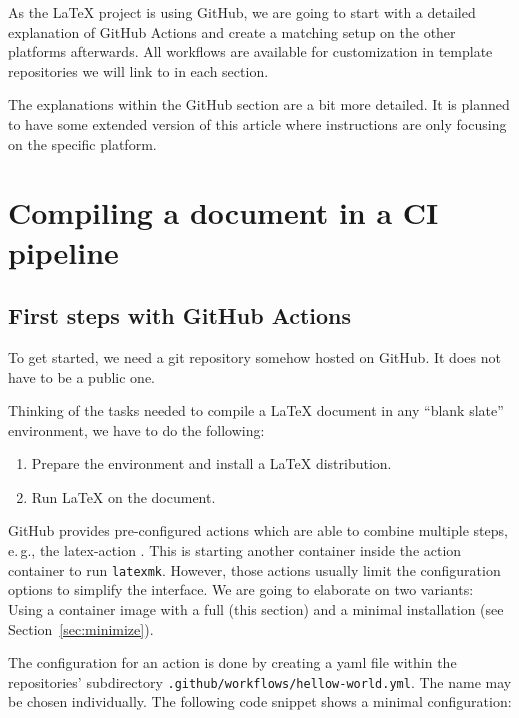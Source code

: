 \documentclass[final]{ltugboat}
\newcommand*{\setListingIcon}[1]{\def\listingIcon{#1}}
\newcommand*{\TeXLive}{\acro{\TeX\,Live}\xspace}
\newcommand*{\command}[1]{\texttt{#1}}
\newcommand*{\file}[1]{\texttt{#1}}
\begin{document}
As the \LaTeX{} project is using GitHub, we are going to start with a detailed explanation of GitHub Actions and create a matching setup on the other platforms afterwards.
All workflows are available for customization in template repositories we will link to in each section.

The explanations within the GitHub section are a bit more detailed.
It is planned to have some extended version of this article where instructions are only focusing on the specific platform.

\section{Compiling a document in a CI pipeline}

\subsection{First steps with GitHub Actions}
\setListingIcon{\GitHub}

To get started, we need a git repository somehow hosted on GitHub.
It does not have to be a public one.

Thinking of the tasks needed to compile a \LaTeX{} document in any “blank slate” environment, we have to do the following:

\begin{enumerate}
\item Prepare the environment and install a \LaTeX{} distribution.
\item Run \LaTeX{} on the document.
\end{enumerate}
%
\noindent GitHub provides pre-configured actions which are able to combine multiple steps, e.\,g., the latex-action \cite{latex-action}.
This  is starting another container inside the action container to run \command{latexmk}.
However, those actions usually limit the configuration options to simplify the interface.
We are going to elaborate on two variants: Using a container image with a full \TeXLive (this section) and a minimal installation (see Section~\ref{sec:minimize}).

The configuration for an action is done by creating a yaml file within the repositories' subdirectory \file{.github/workflows/hellow-world.yml}.
The name may be chosen individually.
The following code snippet shows a minimal configuration:

\inputminted{yaml}{examples/hello-world.yml}
\end{document}

